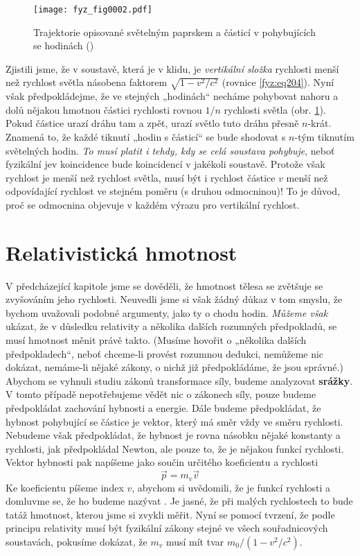     \begin{figure}[ht!]  %
      \centering
      \texttt{[image: fyz\_fig0002.pdf]}
      \caption{Trajektorie opisované světelným paprskem a částicí v pohybujících se hodinách
               (\cite[s.~231]{Feynman01})}
      \label{fyz:fig0002}
    \end{figure}
    Zjistili jsme, že v soustavě, která je v klidu, je \emph{vertikální složka} rychlosti menší než 
    rychlost světla násobena faktorem \(\sqrt{1 - v^2/c^2}\) (rovnice \ref{fyz:eq204}). Nyní však 
    předpokládejme, že ve stejných „hodinách“ necháme pohybovat nahoru a dolů nějakou hmotnou 
    částici rychlosti rovnou \(1 /n\) rychlosti světla (obr. \ref{fyz:fig0002}). Pokud částice urazí 
    dráhu tam a zpět, urazí světlo tuto dráhu přesně \(n\)-krát. Znamená to, že každé tiknutí 
    „hodin s částicí“ se bude shodovat s \(n\)-tým tiknutím světelných hodin. \emph{To musí platit 
    i tehdy, kdy se celá soustava pohybuje}, neboť fyzikální jev koincidence bude koincidencí v 
    jakékoli soustavě. Protože však rychlost je menší než rychlost světla, musí být i rychlost 
    částice \(v\) menší než odpovídající rychlost ve stejném poměru (s druhou odmocninou)! To je 
    důvod, proč se odmocnina objevuje v každém výrazu pro vertikální rychlost.
    
  \section{Relativistická hmotnost}\label{fyz:IchapXVIsecIV}
    V předcházející kapitole jsme se dověděli, že hmotnost tělesa se zvětšuje se zvyšováním jeho 
    rychlosti. Neuvedli jsme si však žádný důkaz v tom smyslu, že bychom uvažovali podobné 
    argumenty, jako ty o chodu hodin. \emph{Můžeme však} ukázat, že v důsledku relativity a 
    několika dalších rozumných předpokladů, se musí hmotnost měnit právě takto. (Musíme hovořit o 
    „několika dalších předpokladech“, neboť chceme-li provést rozumnou dedukci, nemůžeme nic 
    dokázat, nemáme-li nějaké zákony, o nichž již předpokládáme, že jsou správné.) Abychom se 
    vyhnuli studiu zákonů transformace síly, budeme analyzovat \textbf{srážky}. V tomto případě 
    nepotřebujeme vědět nic o zákonech síly, pouze budeme předpokládat zachování hybnosti a 
    energie. Dále budeme předpokládat, že hybnost pohybující se částice je vektor, který má směr 
    vždy ve směru rychlosti. Nebudeme však předpokládat, že hybnost je rovna násobku nějaké 
    konstanty a rychlosti, jak předpokládal Newton, ale pouze to, že je nějakou funkcí rychlosti. 
    Vektor hybnosti pak napíšeme jako součin určitého koeficientu a rychlosti
    \begin{equation}\label{fyz:eq211}
      \vec{p} = m_v\vec{v}
    \end{equation}
    Ke koeficientu píšeme index \(v\), abychom si uvědomili, že je funkcí rychlosti a domluvme se, 
    že ho budeme nazývat . Je jasné, že při malých rychlostech to bude tatáž 
    hmotnost, kterou jsme si zvykli měřit. Nyní se pomocí tvrzení, že podle principu relativity 
    musí být fyzikální zákony stejné ve všech souřadnicových soustavách, pokusíme dokázat, že 
    \(m_v\) musí mít tvar \(m_0/(1 - v^2/c^2)\).
    
